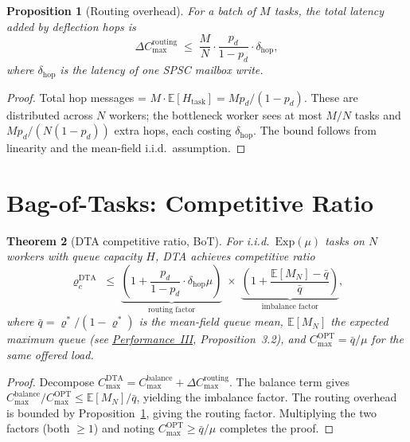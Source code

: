 \documentclass[11pt,a4paper]{article}
\newtheorem{theorem}{Theorem}[section]
\newtheorem{proposition}[theorem]{Proposition}
\begin{document}
\begin{proposition}[Routing overhead]\label{prop:routing_overhead}
For a batch of $M$ tasks, the total latency added by deflection hops is
\[
  \Delta C_{\max}^{\mathrm{routing}}
  \;\le\;
  \frac{M}{N} \cdot \frac{p_d}{1 - p_d} \cdot \delta_{\mathrm{hop}},
\]
where $\delta_{\mathrm{hop}}$ is the latency of one SPSC mailbox write.
\end{proposition}

\begin{proof}
Total hop messages = $M \cdot \mathbb{E}[H_{\mathrm{task}}] = M p_d/(1-p_d)$.
These are distributed across $N$ workers; the bottleneck worker sees at most
$M/N$ tasks and $M p_d / (N(1-p_d))$ extra hops, each costing $\delta_{\mathrm{hop}}$.
The bound follows from linearity and the mean-field i.i.d.\ assumption.
\end{proof}

\section{Bag-of-Tasks: Competitive Ratio}

\begin{theorem}[DTA competitive ratio, BoT]\label{thm:cr_bot}
For i.i.d.\ $\mathrm{Exp}(\mu)$ tasks on $N$ workers with queue capacity $H$,
DTA achieves competitive ratio
\begin{equation}\label{eq:cr_main}
  \varrho_c^{\mathrm{DTA}}
  \;\le\;
  \underbrace{\left(1 + \frac{p_d}{1-p_d}\cdot \delta_{\mathrm{hop}}\mu\right)}_{\text{routing factor}}
  \;\times\;
  \underbrace{\left(1 + \frac{\mathbb{E}[M_N] - \bar q}{\bar q}\right)}_{\text{imbalance factor}},
\end{equation}
where $\bar q = \varrho^*/(1-\varrho^*)$ is the mean-field queue mean,
$\mathbb{E}[M_N]$ the expected maximum queue (see
\hyperref[chap:makespan]{Performance~III}, Proposition~3.2), and
$C_{\max}^{\mathrm{OPT}} = \bar q / \mu$ for the same offered load.
\end{theorem}

\begin{proof}
Decompose $C_{\max}^{\mathrm{DTA}} = C_{\max}^{\mathrm{balance}} + \Delta C_{\max}^{\mathrm{routing}}$.
The balance term gives
$C_{\max}^{\mathrm{balance}} / C_{\max}^{\mathrm{OPT}} \le \mathbb{E}[M_N]/\bar q$,
yielding the imbalance factor.
The routing overhead is bounded by Proposition~\ref{prop:routing_overhead},
giving the routing factor.  Multiplying the two factors
(both $\ge 1$) and noting $C_{\max}^{\mathrm{OPT}} \ge \bar q/\mu$
completes the proof.
\end{proof}
\end{document}
